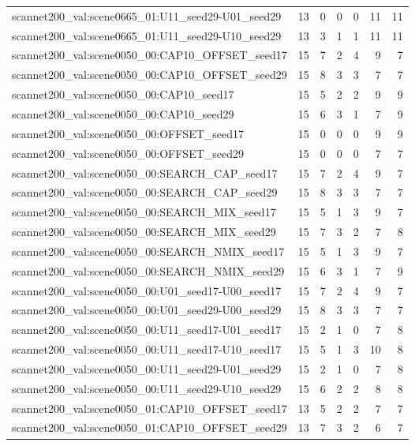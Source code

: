 \begin{table}[t]
\begin{tabular}{lrrrrrr}
scannet200\_val:scene0665\_01:U11\_seed29-U01\_seed29 & 13 & 0 & 0 & 0 & 11 & 11 \\
scannet200\_val:scene0665\_01:U11\_seed29-U10\_seed29 & 13 & 3 & 1 & 1 & 11 & 11 \\
scannet200\_val:scene0050\_00:CAP10\_OFFSET\_seed17 & 15 & 7 & 2 & 4 & 9 & 7 \\
scannet200\_val:scene0050\_00:CAP10\_OFFSET\_seed29 & 15 & 8 & 3 & 3 & 7 & 7 \\
scannet200\_val:scene0050\_00:CAP10\_seed17 & 15 & 5 & 2 & 2 & 9 & 9 \\
scannet200\_val:scene0050\_00:CAP10\_seed29 & 15 & 6 & 3 & 1 & 7 & 9 \\
scannet200\_val:scene0050\_00:OFFSET\_seed17 & 15 & 0 & 0 & 0 & 9 & 9 \\
scannet200\_val:scene0050\_00:OFFSET\_seed29 & 15 & 0 & 0 & 0 & 7 & 7 \\
scannet200\_val:scene0050\_00:SEARCH\_CAP\_seed17 & 15 & 7 & 2 & 4 & 9 & 7 \\
scannet200\_val:scene0050\_00:SEARCH\_CAP\_seed29 & 15 & 8 & 3 & 3 & 7 & 7 \\
scannet200\_val:scene0050\_00:SEARCH\_MIX\_seed17 & 15 & 5 & 1 & 3 & 9 & 7 \\
scannet200\_val:scene0050\_00:SEARCH\_MIX\_seed29 & 15 & 7 & 3 & 2 & 7 & 8 \\
scannet200\_val:scene0050\_00:SEARCH\_NMIX\_seed17 & 15 & 5 & 1 & 3 & 9 & 7 \\
scannet200\_val:scene0050\_00:SEARCH\_NMIX\_seed29 & 15 & 6 & 3 & 1 & 7 & 9 \\
scannet200\_val:scene0050\_00:U01\_seed17-U00\_seed17 & 15 & 7 & 2 & 4 & 9 & 7 \\
scannet200\_val:scene0050\_00:U01\_seed29-U00\_seed29 & 15 & 8 & 3 & 3 & 7 & 7 \\
scannet200\_val:scene0050\_00:U11\_seed17-U01\_seed17 & 15 & 2 & 1 & 0 & 7 & 8 \\
scannet200\_val:scene0050\_00:U11\_seed17-U10\_seed17 & 15 & 5 & 1 & 3 & 10 & 8 \\
scannet200\_val:scene0050\_00:U11\_seed29-U01\_seed29 & 15 & 2 & 1 & 0 & 7 & 8 \\
scannet200\_val:scene0050\_00:U11\_seed29-U10\_seed29 & 15 & 6 & 2 & 2 & 8 & 8 \\
scannet200\_val:scene0050\_01:CAP10\_OFFSET\_seed17 & 13 & 5 & 2 & 2 & 7 & 7 \\
scannet200\_val:scene0050\_01:CAP10\_OFFSET\_seed29 & 13 & 7 & 3 & 2 & 6 & 7 \\

\end{tabular}
\end{table}
